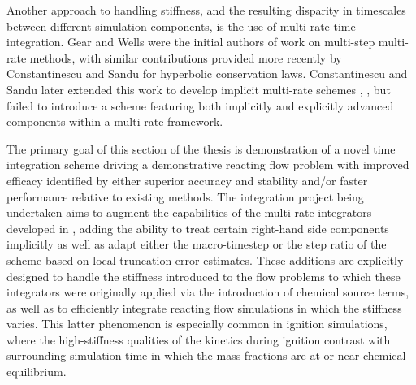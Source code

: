 Another approach to handling stiffness, and the resulting disparity in
timescales between different simulation components, is the use of multi-rate
time integration. Gear and Wells \cite{gear1984multirate} were the initial authors of
work on multi-step multi-rate methods, with similar contributions provided more
recently by Constantinescu and Sandu \cite{constantinescu2007multirate} for hyperbolic
conservation laws. Constantinescu and Sandu later extended this work to develop implicit
multi-rate schemes \cite{constantinescu2010extrapolated},
\cite{constantinescu2013extrapolated}, but failed to introduce a scheme featuring both
implicitly and explicitly advanced components within a multi-rate framework.


The primary goal of this section of the thesis is demonstration of a novel
time integration scheme driving a demonstrative reacting flow problem
with improved efficacy identified by either superior accuracy and stability and/or
faster performance relative to existing methods. The integration project
being undertaken aims to augment the capabilities of the multi-rate integrators
developed in \cite{mikida2019multi}, adding the ability to treat certain
right-hand side components implicitly as well as adapt either the macro-timestep
or the step ratio of the scheme based on local truncation error estimates. These
additions are explicitly designed to handle the stiffness introduced to the flow
problems to which these integrators were originally applied via the introduction
of chemical source terms, as well as to efficiently integrate reacting flow
simulations in which the stiffness varies. This latter phenomenon is especially
common in ignition simulations, where the high-stiffness qualities of the
kinetics during ignition contrast with surrounding simulation time in which
the mass fractions are at or near chemical equilibrium.

